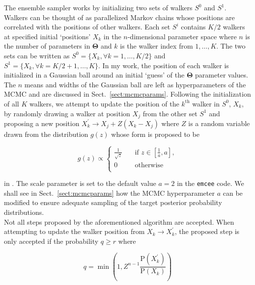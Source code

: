 The ensemble sampler works by initializing two sets of walkers $S^0$ and $S^1$. Walkers can be 
thought of as parallelized Markov chains whose positions are correlated with the positions 
of other walkers. Each set $S^i$ 
contains $K/2$ walkers at specified initial `positions' $X_k$ in the $n$-dimensional parameter 
space where $n$ is the number of parameters in $\mathbf{\Theta}$ 
and $k$ is the walker index from $1,\dots,K$. 
The two sets can be written as $S^0 = \{X_k, \forall k=1,\dots,K/2\}$ and 
$S^1 = \{X_k, \forall k=K/2+1,\dots,K\}$. In my work, the position of each walker is 
initialized in a Gaussian ball around an initial `guess' of the $\mathbf{\Theta}$ parameter 
values. The $n$ means and widths of the Gaussian ball are left as hyperparameters of the MCMC 
and are discussed in Sect.~\ref{sect:mcmcparams}. 
Following the initialization of all $K$ walkers, we attempt to update the position 
of the $k^{\mathrm{th}}$ walker in $S^0$, $X_k$, by randomly drawing a walker at position 
$X_j$ from the 
other set $S^1$ and proposing a new position $X_k^{'} \to X_j + Z(X_k-X_j)$ where $Z$ is a 
random variable drawn from the distribution $g(z)$ whose form is proposed to be 

\begin{equation}
g(z) \propto 
\begin{cases}
\frac{1}{\sqrt{z}} & \quad \text{if } z \in \left[ \frac{1}{a}, a \right], \\
0 & \quad \text{otherwise}  \\
\end{cases} 
\label{eq:gprob}
\end{equation}

\noindent in \cite{goodman10}. The scale parameter is set to the default value 
$a=2$ in the \texttt{emcee} code. We shall see in Sect.~\ref{sect:mcmcparams} 
how the MCMC hyperparameter 
$a$ can be modified to ensure adequate sampling of the target posterior probability 
distributions. \\

Not all steps proposed by the aforementioned algorithm 
are accepted. When attempting to update the walker position from 
$X_k \to X_k^{'}$, the proposed step is only accepted if the probability $q \geq r$ 
where

\begin{equation}
q = \min{\left( 1, Z^{n-1} \frac{\mathrm{P}(X_k^{'})}{\mathrm{P}(X_k)} \right)}
\end{equation}

